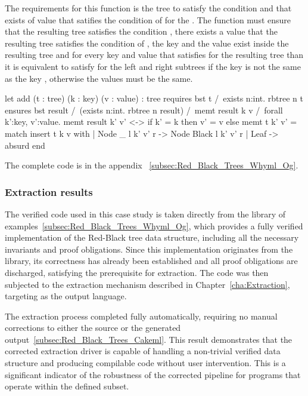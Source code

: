 The requirements for this function is the tree  to satisfy the condition  and that exists of value that satifies the condition
of  for the . The function must ensure that the resulting tree satisfies the condition , there exists a value
that the resulting tree satisfies the condition of , the key  and the value  exist inside the resulting
tree and for every key  and value  that satisfies  for the resulting tree than it is equivalent to satisfy 
 for the left and right subtrees if the key  is not the same as the key , otherwise the values must be the same.

\begin{whylang}
    let add (t : tree) (k : key) (v : value) : tree
        requires { bst t /\ exists n:int. rbtree n t }
        ensures { bst result /\ (exists n:int. rbtree n result) /\
        memt result k v /\
        forall k':key, v':value.
        memt result k' v' <-> if k' = k then v' = v else memt t k' v' }
    = match insert t k v with
        | Node _ l k' v' r -> Node Black l k' v' r
        | Leaf -> absurd
        end
\end{whylang}

The complete code is in the appendix ~\ref{subsec:Red_Black_Trees_Whyml_Og}.

\subsubsection{Extraction results}

The verified code used in this case study is taken directly from the \whythree library of examples~\ref{subsec:Red_Black_Trees_Whyml_Og}, which 
provides a fully verified \whyml implementation of the Red-Black tree data structure, including all the necessary invariants and proof obligations. 
Since this implementation originates from the \whythree library, its correctness has already been established and all proof obligations are discharged, 
satisfying the prerequisite for extraction. The code was then subjected to the extraction mechanism described in Chapter~\ref{cha:Extraction}, 
targeting \cml as the output language.

The extraction process completed fully automatically, requiring no manual corrections to either the \whyml source or the generated \cml 
output~\ref{subsec:Red_Black_Trees_Cakeml}. This result demonstrates that the corrected extraction driver is capable of handling a non-trivial 
verified data structure and producing compilable \cml code without user intervention. This is a significant indicator of the robustness of the 
corrected pipeline for programs that operate within the defined \whyml subset.


